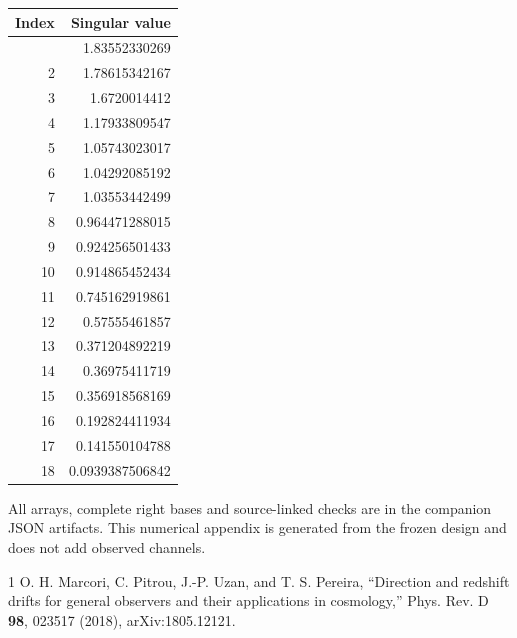\documentclass[aps,prd,preprint,onecolumn,notitlepage]{revtex4-2}
\begin{document}
\begin{longtable}[]{@{}rr@{}}
\toprule\noalign{}
Index & Singular value \\
\midrule\noalign{}
\endhead
\bottomrule\noalign{}
\endlastfoot
1 & 1.83552330269 \\
2 & 1.78615342167 \\
3 & 1.6720014412 \\
4 & 1.17933809547 \\
5 & 1.05743023017 \\
6 & 1.04292085192 \\
7 & 1.03553442499 \\
8 & 0.964471288015 \\
9 & 0.924256501433 \\
10 & 0.914865452434 \\
11 & 0.745162919861 \\
12 & 0.57555461857 \\
13 & 0.371204892219 \\
14 & 0.36975411719 \\
15 & 0.356918568169 \\
16 & 0.192824411934 \\
17 & 0.141550104788 \\
18 & 0.0939387506842 \\
\end{longtable}

All arrays, complete right bases and source-linked checks are in the companion JSON artifacts. This numerical appendix is generated from the frozen design and does not add observed channels.

\begin{thebibliography}{1}
 O. H. Marcori, C. Pitrou, J.-P. Uzan, and T. S. Pereira, ``Direction and redshift drifts for general observers and their applications in cosmology,'' Phys. Rev. D \textbf{98}, 023517 (2018), arXiv:1805.12121.
\end{thebibliography}
\end{document}
